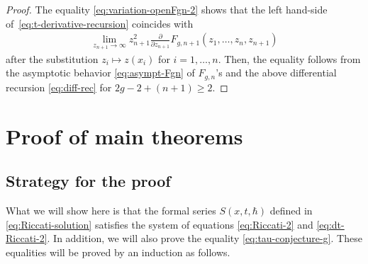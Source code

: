 \documentclass[pdftex]{sigma}
\theoremstyle{definition}
\numberwithin{equation}{section}
\def\p{\partial}
\begin{document}
\begin{proof}
The equality \eqref{eq:variation-openFgn-2} shows that
the left hand-side of~\eqref{eq:t-derivative-recursion}
coincides with
\begin{gather*}
\lim_{z_{n+1} \rightarrow \infty} z_{n+1}^{2}
\frac{\p}{\p z_{n+1}} F_{g,n+1}(z_{1},\dots,z_{n},z_{n+1})
\end{gather*}
after the substitution $z_{i} \mapsto z(x_{i})$ for $i=1,\dots,n$.
Then, the equality follows from
the asymptotic behavior \eqref{eq:asympt-Fgn} of $F_{g,n}$'s
and the above dif\/ferential recursion \eqref{eq:diff-rec}
for $2g-2+ (n+1) \ge 2$.
\end{proof}


\section{Proof of main theorems}
\label{section:proof}

\subsection{Strategy for the proof}

What we will show here is that the formal series $S(x,t,\hbar)$
def\/ined in \eqref{eq:Riccati-solution} satisf\/ies
the system of equations \eqref{eq:Riccati-2} and
\eqref{eq:dt-Riccati-2}. In addition, we will also prove
the equality \eqref{eq:tau-conjecture-g}.
These equalities will be proved by an induction as follows.
\end{document}
